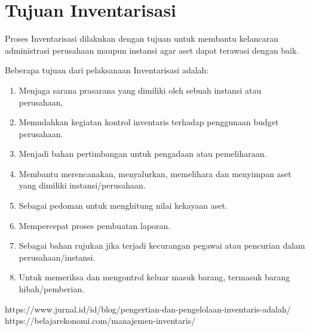 \section{Tujuan Inventarisasi}

Proses Inventarisasi dilakukan dengan tujuan untuk membantu kelancaran administrasi perusahaan maupun instansi agar aset dapat terawasi dengan baik.

Beberapa tujuan dari pelaksanaan Inventarisasi adalah:

\begin{enumerate}
    \item Menjaga sarana prasarana yang dimiliki oleh sebuah instansi atau perusahaan,
    \item Memudahkan kegiatan kontrol inventaris terhadap penggunaan budget perusahaan.
    \item Menjadi bahan pertimbangan untuk pengadaan atau pemeliharaan.
    \item Membantu merencanakan, menyalurkan, memelihara dan menyimpan aset yang dimiliki instansi/perusahaan.
    \item Sebagai pedoman untuk menghitung nilai kekayaan aset.
    \item Mempercepat proses pembuatan laporan.
    \item Sebagai bahan rujukan jika terjadi kecurangan pegawai atau pencurian dalam perusahaan/instansi.
    \item Untuk memeriksa dan mengontrol keluar masuk barang, termasuk barang hibah/pemberian.
\end{enumerate}

https://www.jurnal.id/id/blog/pengertian-dan-pengelolaan-inventaris-adalah/
https://belajarekonomi.com/manajemen-inventaris/

